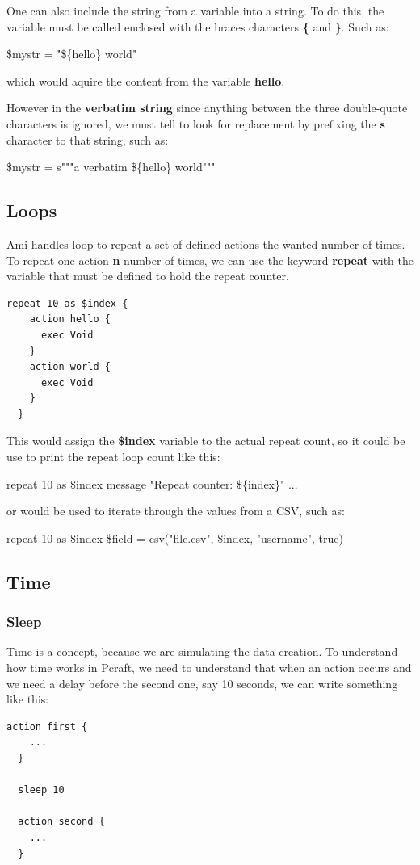 \documentclass[10pt]{article}
\begin{document}
One can also include the string from a variable into a string. To do this, the variable must be called enclosed with the braces characters \textbf{\{} and \textbf{\}}. Such as:
\begin{center}
  \$mystr = "\$\{hello\} world"
\end{center}
which would aquire the content from the variable \textbf{hello}.

However in the \textbf{verbatim string} since anything between the three double-quote characters is ignored, we must tell to look for replacement by prefixing the \textbf{s} character to that string, such as:
\begin{center}
  \$mystr = s"""a verbatim \$\{hello\} world"""
\end{center}

\subsection{Loops}

Ami handles loop to repeat a set of defined actions the wanted number of times. To repeat one action \textbf{n} number of times, we can use the keyword \textbf{repeat} with the variable that must be defined to hold the repeat counter.

\begin{lstlisting}[caption={Repeat loop},captionpos=b]
  repeat 10 as $index {
    action hello {      
      exec Void
    }
    action world {      
      exec Void
    }    
  }
\end{lstlisting}

This would assign the \textbf{\$index} variable to the actual repeat count, so it could be use to print the repeat loop count like this:
\begin{center}
  repeat 10 as \$index {
    message "Repeat counter: \$\{index\}"
    ...
  }
\end{center}

or would be used to iterate through the values from a CSV, such as:

\begin{center}
  repeat 10 as \$index {
    \$field = csv("file.csv", \$index, "username", true)
  }
\end{center}

\subsection{Time}

\subsubsection{Sleep}
Time is a concept, because we are simulating the data creation. To understand how time works in Pcraft, we need to understand that when an action occurs and we need a delay before the second one, say 10 seconds, we can write something like this:
\begin{lstlisting}[caption={Time Introduction},captionpos=b]
  action first {
    ...
  }

  sleep 10

  action second {
    ...
  }
\end{lstlisting}
\end{document}

